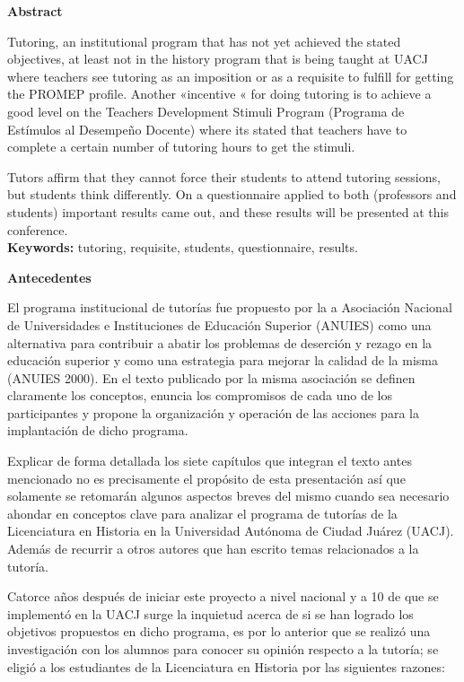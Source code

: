 \bigskip
\textbf{Abstract}

Tutoring, an institutional program that has not yet achieved the stated
objectives, at least not in the history program that is being taught at
UACJ where teachers see tutoring as an imposition or as a requisite to
fulfill for getting the PROMEP profile. Another «incentive « for doing
tutoring is to achieve a good level on the Teachers Development Stimuli
Program (Programa de Estímulos al Desempeño Docente) where its stated that
teachers have to complete a certain number of tutoring hours to get the
stimuli.


Tutors affirm that they cannot force their students to attend tutoring
sessions, but students think differently. On a questionnaire applied to
both (professors and students) important results came out, and these
results will be presented at this conference.\\
\textbf{Keywords:} tutoring, requisite, students, questionnaire, results.


\bigskip
\textbf{Antecedentes}

El programa institucional de tutorías fue propuesto por la a Asociación
Nacional  de Universidades e Instituciones de Educación Superior (ANUIES) 
como una alternativa para contribuir a abatir los problemas de deserción y
rezago en la educación superior y como una estrategia para mejorar la
calidad de la misma (ANUIES 2000). En el texto publicado por la misma
asociación  se definen  claramente los conceptos, enuncia los compromisos
de cada uno de los participantes y  propone la organización y operación de
las acciones  para la implantación  de dicho programa.


Explicar de forma detallada los siete capítulos que integran el texto antes
mencionado no es precisamente el propósito de esta presentación así que
solamente se retomarán algunos aspectos breves del mismo cuando sea
necesario ahondar en conceptos clave para analizar el programa de tutorías
de la Licenciatura en Historia en la Universidad Autónoma de Ciudad Juárez
(UACJ). Además de recurrir a otros autores que han escrito temas
relacionados a la tutoría.


Catorce años después de iniciar este proyecto a nivel nacional y a 10 de que
se implementó  en la UACJ surge la inquietud acerca de si se han logrado
los objetivos propuestos en dicho programa, es por lo anterior que se
realizó una  investigación con los alumnos para conocer su opinión respecto
a la tutoría;  se eligió  a los estudiantes de la Licenciatura  en Historia
por las siguientes razones:

